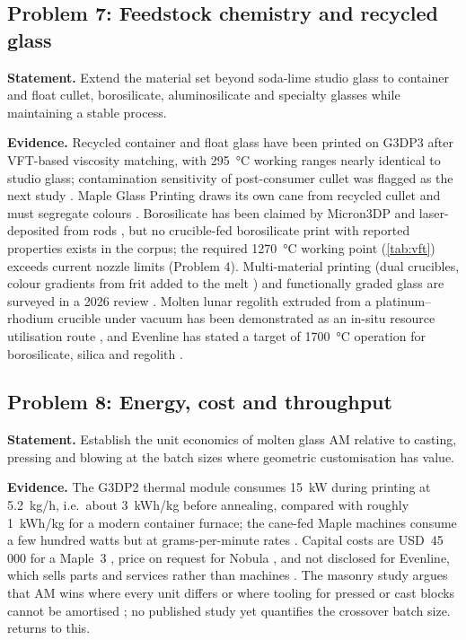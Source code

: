 \subsection{Problem 7: Feedstock chemistry and recycled glass}
\textbf{Statement.} Extend the material set beyond soda-lime studio glass to container and float cullet, borosilicate, aluminosilicate and specialty glasses while maintaining a stable process.

\textbf{Evidence.} Recycled container and float glass have been printed on G3DP3 after VFT-based viscosity matching, with \SI{295}{\celsius} working ranges nearly identical to studio glass; contamination sensitivity of post-consumer cullet was flagged as the next study \citep{stern2024cgc}. Maple Glass Printing draws its own cane from recycled cullet and must segregate colours \citep{maple_ammedia}. Borosilicate has been claimed by Micron3DP \citep{micron3dp_acers} and laser-deposited from rods \citep{froehlich2022}, but no crucible-fed borosilicate print with reported properties exists in the corpus; the required \SI{1270}{\celsius} working point (\cref{tab:vft}) exceeds current nozzle limits (Problem 4). Multi-material printing (dual crucibles, colour gradients from frit added to the melt \citep{klein2015}) and functionally graded glass are surveyed in a 2026 review \citep{multimat2026}. Molten lunar regolith extruded from a platinum--rhodium crucible under vacuum has been demonstrated as an in-situ resource utilisation route \citep{regolithreview2023,regolithvac2024}, and Evenline has stated a target of \SI{1700}{\celsius} operation for borosilicate, silica and regolith \citep{stern2024cgc}.

\subsection{Problem 8: Energy, cost and throughput}
\textbf{Statement.} Establish the unit economics of molten glass AM relative to casting, pressing and blowing at the batch sizes where geometric customisation has value.

\textbf{Evidence.} The G3DP2 thermal module consumes \SI{15}{kW} during printing at \SI{5.2}{kg/h}, i.e.\ about \SI{3}{kWh/kg} before annealing, compared with roughly \SI{1}{kWh/kg} for a modern container furnace; the cane-fed Maple machines consume a few hundred watts but at grams-per-minute rates \citep{inamura2018,maple_ammedia}. Capital costs are USD~45\,000 for a Maple~3 \citep{maple_aniwaa}, price on request for Nobula \citep{nobula_aniwaa}, and not disclosed for Evenline, which sells parts and services rather than machines \citep{evenline_web}. The masonry study argues that AM wins where every unit differs or where tooling for pressed or cast blocks cannot be amortised \citep{mit2024masonry}; no published study yet quantifies the crossover batch size.  returns to this.

